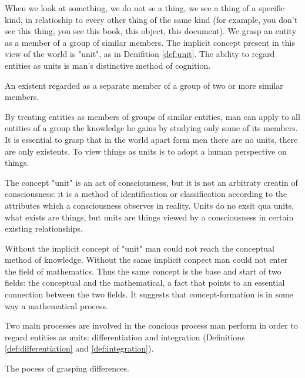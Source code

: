         When we look at something, we do not se a thing, we see a thing of a specific kind, in relatioship to every other thing of the same kind (for example, you don't see this thing, you see this book, this object, this document). We grasp an entity as a member of a group of similar members. The implicit concept present in this view of the world is "unit", as in Denifition \ref{def:unit}. The ability to regard entities as units is man's distinctive method of cognition.

            \begin{definition}[Unit]
            \label{def:unit}
                An existent regarded as a separate member of a group of two or more similar members.
            \end{definition}

        By treating entities as members of groups of similar entities, man can apply to all entities of a group the knowledge he gains by studying only some of its members. It is essential to grasp that in the world apart form men there are no units, there are only existents. To view things as units is to adopt a human perspective on things.

        The concept "unit" is an act of consciousness, but it is not an arbitraty creatin of consciousness: it is a method of identification or classification according to the attributes which a consciousness observes in reality. Units do no exsit qua units, what exists are things, but units are things viewed by a consciousness in certain existing relationships.

        Without the implicit concept of "unit" man could not reach the conceptual method of knowledge. Without the same implicit conpect man could not enter the field of mathematics. Thus the same concept is the base and start of two fields: the conceptual and the mathematical, a fact that points to an essential connection between the two fields. It suggests that concept-formation is in some way a mathematical process.

        Two main processes are involved in the concious process man perform in order to regard entities as units: differentiation and integration (Definitions \ref{def:differentiation} and \ref{def:integration}).

            \begin{definition}[Differentiation]
            \label{def:differentiation}
                The pocess of grasping differences.
            \end{definition}


